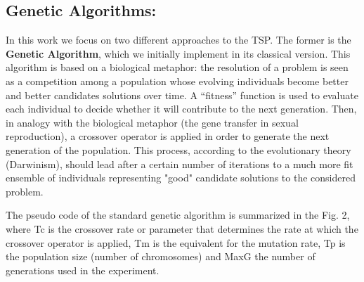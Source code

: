 \subsection{Genetic Algorithms:}
In this work we focus on two different approaches to the TSP.
The former is the \textbf{Genetic Algorithm}, which we initially implement in its classical version.
This algorithm is based on a biological metaphor: the resolution of a problem is seen as a competition among a population whose evolving individuals become better and better candidates solutions over time. 
A “fitness” function is used to evaluate each individual to decide whether it will contribute to the next
generation. 
Then, in analogy with the biological metaphor (the gene transfer in sexual reproduction), a crossover operator is applied in order to generate the next generation of the population.
This process, according to the evolutionary theory (Darwinism), should lead after a certain number of iterations to a much more fit ensemble of individuals representing "good" candidate solutions to the considered problem.

The pseudo code of the standard genetic algorithm is summarized in the Fig. 2, where Tc is
the crossover rate or parameter that determines the rate at which the crossover operator is
applied, Tm is the equivalent for the mutation rate, Tp is the population size (number of
chromosomes) and MaxG the number of generations used in the experiment.

